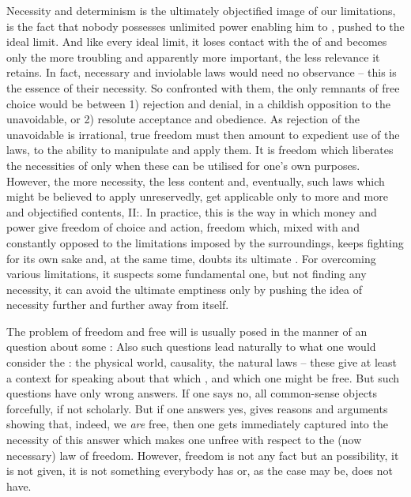 %
Necessity and determinism is the ultimately objectified image of our
limitations, is the fact that nobody possesses unlimited power enabling him to
, pushed to the ideal limit. And like every ideal limit, it
loses contact with the  of  and becomes only the
more troubling and apparently more important, the less relevance it retains.  In
fact, necessary and inviolable laws would need no observance -- this is the
essence of their necessity. So confronted with them, the only remnants of free
choice would be between 1) rejection and denial, in a childish opposition to the
unavoidable, or 2) resolute acceptance and obedience. As rejection of the
unavoidable is irrational, true freedom must then amount to expedient use of the
laws, to the ability to manipulate and apply them.  It is freedom which
liberates  the necessities of  only when these can be
utilised for one's own purposes. However, the more necessity, the less content
and, eventually, such laws which might be believed to apply unreservedly, get
applicable only to more and more  and objectified contents,
II:. In practice, this is the way in which money and power
give freedom of choice and action, freedom which, mixed with and constantly
opposed to the limitations imposed by the surroundings, keeps fighting for its
own sake and, at the same time, doubts its ultimate .  For
overcoming various  limitations, it suspects some fundamental one,
but not finding any  necessity, it can avoid the ultimate emptiness
only by pushing the idea of necessity further and further away from itself.


\pa%
The problem of freedom and free will is usually posed in the manner of an
 question about some :   Also such questions lead naturally to what one
would consider the : the physical world, causality, the natural laws
-- these give at least a context for speaking about that which , and
 which one might be free.  But such questions have only wrong answers.
If one says no, all common-sense objects forcefully, if not scholarly.
But if one answers yes, gives reasons and arguments showing that, indeed, we
{\em are} free, then one gets immediately captured into the necessity of this
answer which makes one unfree with respect to the (now necessary) law of
freedom.  However, freedom is not any fact but an  possibility,
it is not given, it is not something everybody has or, as the case may be, does
not have.

